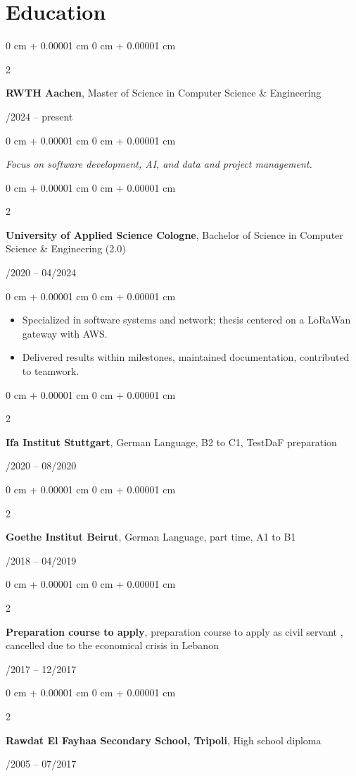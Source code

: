 \documentclass[10pt, letterpaper]{article}
\newenvironment{highlights}{
    \begin{itemize}[
        topsep=0.10 cm,
        parsep=0.10 cm,
        partopsep=0pt,
        itemsep=0pt,
        leftmargin=0 cm + 10pt
    ]
}{
    \end{itemize}
} %
\newenvironment{onecolentry}{
    \begin{adjustwidth}{
        0 cm + 0.00001 cm
    }{
        0 cm + 0.00001 cm
    }
}{
    \end{adjustwidth}
} %
\newenvironment{twocolentry}[2][]{
    \onecolentry
    \def\secondColumn{#2}
    \setcolumnwidth{\fill, 4.5 cm}
    \begin{paracol}{2}
}{
    \switchcolumn \raggedleft \secondColumn
    \end{paracol}
    \endonecolentry
} %
\begin{document}
  \section{Education}
\begin{twocolentry}{04/2024 -- present}
\textbf{RWTH Aachen}, Master of Science in Computer Science \& Engineering
\end{twocolentry}
\begin{onecolentry}
\textit{Focus on software development, AI, and data and project management.}
\end{onecolentry}

\vspace{0.1cm}

\begin{twocolentry}{09/2020 -- 04/2024}
\textbf{University of Applied Science Cologne}, Bachelor of Science in Computer Science \& Engineering (2.0)
\end{twocolentry}
\begin{onecolentry}
\begin{highlights}
\item Specialized in software systems and network; thesis centered on a LoRaWan gateway with AWS.
\item Delivered results within milestones, maintained documentation, contributed to teamwork.
\end{highlights}
\end{onecolentry}
\vspace{0.1cm}
\begin{twocolentry}{01/2020 -- 08/2020}
    \textbf{Ifa Institut Stuttgart}, German Language, B2 to C1, TestDaF preparation 
    \end{twocolentry}

\vspace{0.1cm}
\begin{twocolentry}{01/2018 -- 04/2019}
    \textbf{Goethe Institut Beirut}, German Language, part time, A1 to B1
    \end{twocolentry}
\vspace{0.1cm}
\begin{twocolentry}{08/2017 -- 12/2017}
    \textbf{Preparation course to apply}, preparation course to apply as civil servant , cancelled due to the economical crisis in Lebanon
    \end{twocolentry}
\begin{twocolentry}{09/2005 -- 07/2017}
    \textbf{Rawdat El Fayhaa Secondary School, Tripoli}, High school diploma 
    \end{twocolentry}
 
\end{document}
